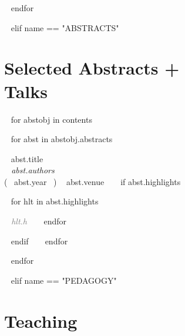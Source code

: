 ~{ endfor }~






~{ elif name == "ABSTRACTS" }~

\section{Selected Abstracts +  \\Talks}

~{ for abstobj in contents }~ 
\begin{etaremune}[itemindent=-\bibhang, topsep=0pt,
				   itemsep=\bibsep,partopsep=0pt,parsep=0pt,leftmargin={\bibhang+\widthof{[999]}}] 
    ~{ for abst in abstobj.abstracts  }~
    \item ~{{ abst.title }}~ \\
     \textit{~{{ abst.authors }}~}\\
     (~{{ abst.year }}~) ~{{ abst.venue }}~
     ~{ if abst.highlights }~
     	\begin{innerlist}
     	~{ for hlt in abst.highlights }~
	     \item  \textcolor{grey}{\textit{~{{ hlt.h }}~} }
     	~{ endfor }~
     	\end{innerlist}
     ~{ endif }~
	~{ endfor }~


\end{etaremune}
~{ endfor }~




~{ elif name == "PEDAGOGY" }~

\section{Teaching}

